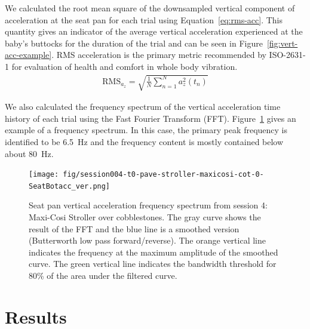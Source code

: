 \documentclass[a4paper]{article}
\begin{document}
We calculated the root mean square of the downsampled vertical component of
acceleration at the seat pan for each trial using Equation~\ref{eq:rms-acc}.
This quantity gives an indicator of the average vertical acceleration
experienced at the baby's buttocks for the duration of the trial and can be seen
in Figure~\ref{fig:vert-acc-example}. RMS acceleration is the primary metric
recommended by ISO-2631-1 for evaluation of health and comfort in whole body
vibration.
%
\begin{align}
  \textrm{RMS}_{a_z} = \sqrt{\frac{1}{N}\sum_{n=1}^{N} a_z^2(t_n)}
  \label{eq:rms-acc}
\end{align}

We also calculated the frequency spectrum of the vertical acceleration time
history of each trial using the Fast Fourier Transform (FFT).
Figure~\ref{fig:freq-spectrum} gives an example of a frequency spectrum. In this
case, the primary peak frequency is identified to be 6.5~\si{\hertz} and the
frequency content is mostly contained below about 80~\si{\hertz}.
%
\begin{figure}
  \centering
  \texttt{[image: fig/session004-t0-pave-stroller-maxicosi-cot-0-SeatBotacc\_ver.png]}
  \caption{Seat pan vertical acceleration frequency spectrum from session 4:
  Maxi-Cosi Stroller over cobblestones. The gray curve shows the result of the
  FFT and the blue line is a smoothed version (Butterworth low pass
  forward/reverse). The orange vertical line indicates the frequency at the
  maximum amplitude of the smoothed curve. The green vertical line indicates the
  bandwidth threshold for 80\% of the area under the filtered curve.}
  \label{fig:freq-spectrum}
\end{figure}

\section{Results}
%
\end{document}
